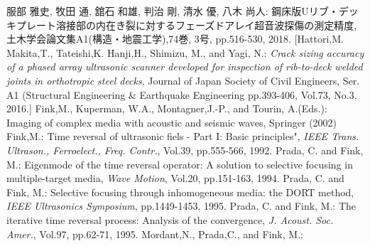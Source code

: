﻿\documentclass{jjsce}
\begin{document}
\begin{thebibliography}{9}
	服部 雅史, 牧田 通, 舘石 和雄, 判治 剛, 清水 優, 八木 尚人:
	鋼床版Uリブ・デッキプレート溶接部の内在き裂に対するフェーズドアレイ超音波探傷の測定精度,
	土木学会論文集A1(構造・地震工学),74巻, 3号, pp.516-530, 2018.
	[Hattori,M. Makita,T., Tateishi,K. Hanji,H., Shimizu, M., and Yagi, N.: 
	\textit{Crack sizing accuracy of a phased array ultrasonic scanner developed for 
	inspection of rib-to-deck welded joints in orthotropic steel decks}, 
	Journal of Japan Society of Civil Engineers, 
	Ser. A1 (Structural Engineering \& Earthquake Engineering 
	pp.393-406, Vol.73, No.3, 2016.]
	Fink,M., Kuperman, W.A.,  Montagner,J.-P., and Tourin, A.(Eds.):
	Imaging of complex media with acoustic and seismic waves, Springer (2002)
	Fink,M.:
	Time reversal of ultrasonic fiels - Part I: Basic principles",
	\textit{IEEE Trans. Ultrason., Ferroelect., Freq. Contr.}, Vol.39, pp.555-566, 1992.
	Prada, C. and Fink, M.: 
	Eigenmode of the time reversal operator: A solution to selective focusing in multiple-target media, 
	\textit{ Wave Motion}, Vol.20, pp.151-163, 1994. 
	Prada, C. and Fink, M.: 
	Selective focusing through inhomogeneous media: the DORT method,
	\textit{ IEEE Ultrasonics Symposium}, pp.1449-1453, 1995. 
	Prada, C. and Fink, M.: 
	The iterative time reversal process: Analysis of the convergence, 
	\textit{J. Acoust. Soc. Amer.}, Vol.97, pp.62-71, 1995.
	Mordant,N., Prada,C., and Fink, M.:

\end{thebibliography}
\end{document}
